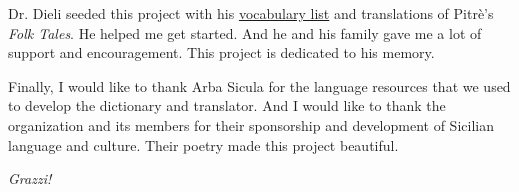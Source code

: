 \documentclass[10pt,letterpaper]{article}
\begin{document}
\vspace{-0.125em}
Dr. Dieli seeded this project with his
\href{http://www.dieli.net/SicilyPage/SicilianLanguage/Vocabulary.html}{vocabulary list}
and translations of Pitrè's \textit{Folk Tales}.  He helped me get started.
And he and his family gave me a lot of support and encouragement.
This project is dedicated to his memory.

\vspace{-0.125em}
Finally, I would like to thank Arba Sicula for the language resources that we used to develop
the dictionary and translator.  And I would like to thank the organization and its members
for their sponsorship and development of Sicilian language and culture.
Their poetry made this project beautiful.

\vspace{-0.125em}
\textit{Grazzi!}




\newpage

\hypertarget{bibliography}{}

\vspace{-1.50em}

\end{document}
